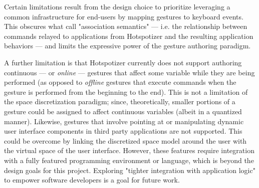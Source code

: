 Certain limitations result from the design choice to prioritize leveraging a common infrastructure for end-users by mapping gestures to keyboard events. This obscures what \textcite{Hartmann:2007} call "association semantics" --- i.e. the relationship between commands relayed to applications from Hotspotizer and the resulting application behaviors --- and limits the expressive power of the gesture authoring paradigm.

A further limitation is that Hotspotizer currently does not support authoring continuous --- or \emph{online} \parencite{Hoste:2014} --- gestures that affect some variable while they are being performed (as opposed to \emph{offline} gestures that execute commands when the gesture is performed from the beginning to the end). This is not a limitation of the space discretization paradigm; since, theoretically, smaller portions of a gesture could be assigned to affect continuous variables (albeit in a quantized manner). Likewise, gestures that involve pointing at or manipulating dynamic user interface components in third party applications are not supported. This could be overcome by linking the discretized space model around the user with the virtual space of the user interface. However, these features require integration with a fully featured programming environment or language, which is beyond the design goals for this project. Exploring "tighter integration with application logic" \parencite{Hartmann:2007} to empower software developers is a goal for future work.
